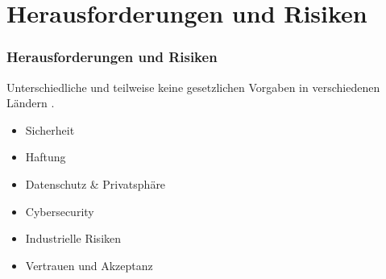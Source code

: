 \section{Herausforderungen und Risiken}

\begin{frame}
    \frametitle{Herausforderungen und Risiken}

    Unterschiedliche und teilweise keine gesetzlichen Vorgaben in verschiedenen Ländern \cite{doi:10.1080/01441647.2018.1494640}. \pause

    \begin{itemize}
        \item Sicherheit \pause
        \item Haftung \pause
        \item Datenschutz \& Privatsphäre \pause
        \item Cybersecurity \pause
        \item Industrielle Risiken \pause
        \item Vertrauen und Akzeptanz
    \end{itemize}
\end{frame}
